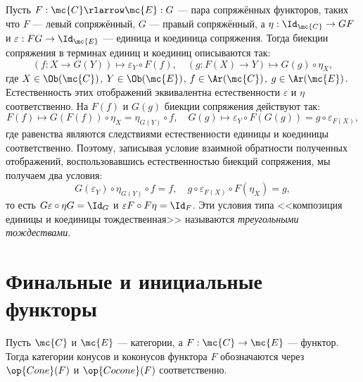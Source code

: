 \documentclass[
	extrafontsizes,
	11pt,
	hyphens,
]{memoir}
\begin{document}
Пусть \(F : \mc{C} \rlarrow \mc{E} : G\) --- пара сопряжённых функторов, таких что \(F\) --- левый сопряжённый, \(G\) --- правый сопряжённый, а \(\eta : \Id_{\mc{C}} \to GF\) и \(\varepsilon : FG \to \Id_{\mc{E}}\) --- единица и коединица сопряжения.
Тогда биекции сопряжения в терминах единиц и коединиц описываются так:
\begin{equation*}
(f : X \to G(Y)) \mapsto \varepsilon_Y \circ F(f),
\quad
(g : F(X) \to Y) \mapsto G(g) \circ \eta_X, 
\end{equation*}
где \(X \in \Ob(\mc{C})\), \(Y \in \Ob(\mc{E})\), \(f \in \Ar(\mc{C})\), \(g \in \Ar(\mc{E})\).
Естественность этих отображений эквивалентна естественности \(\varepsilon\) и \(\eta\) соответственно.
На \(F(f)\) и \(G(g)\) биекции сопряжения действуют так:
\begin{equation*}
F(f) \mapsto G(F(f)) \circ \eta_X = \eta_{G(Y)} \circ f,
\quad
G(g) \mapsto \varepsilon_Y \circ F(G(g)) = g \circ \varepsilon_{F(X)},
\end{equation*}
где равенства являются следствиями естественности единицы и коединицы соответственно.
Поэтому, записывая условие взаимной обратности полученных отображений, воспользовавшись естественностью биекций сопряжения, мы получаем два условия:
\begin{equation*}
G(\varepsilon_Y) \circ \eta_{G(Y)} \circ f = f,
\quad
g \circ \varepsilon_{F(X)} \circ F(\eta_X) = g,
\end{equation*}
то есть \(G \varepsilon \circ \eta G = \Id_G\) и \(\varepsilon F \circ F \eta = \Id_F\).
Эти условия типа <<композиция единицы и коединицы тождественная>> называются \emph{треугольными тождествами}.


\section{Финальные и инициальные функторы}

\begin{notation}
Пусть \(\mc{C}\) и \(\mc{E}\) --- категории, а \(F : \mc{C} \to \mc{E}\) --- функтор.
Тогда категории конусов и коконусов функтора \(F\) обозначаются через \(\op{Cone}(F)\) и \(\op{Cocone}(F)\) соответственно.
\end{notation}
\end{document}
